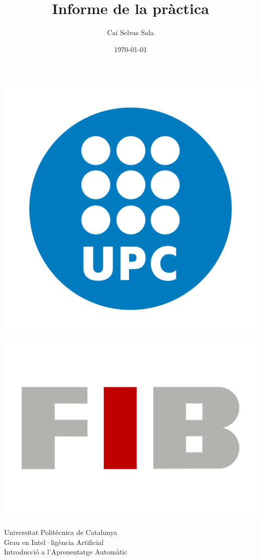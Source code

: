\begin{titlepage}

\title{\vspace{-4ex}\Huge\textbf{Informe de la pràctica}}
\author{\Large Cai Selvas Sala}
\date{\large\today}

\centering
\maketitle
\thispagestyle{empty}

\begin{centering}
\includegraphics[scale=0.17]{Logos UPC/Logo UPC.png}\\
\includegraphics[scale=0.13]{Logos UPC/Logo FIB.png}
\end{centering}

\LARGE
{Universitat Politècnica de Catalunya\\[5pt]
Grau en Intel·ligència Artificial\\[5pt]
Introducció a l'Aprenentatge Automàtic}

\end{titlepage}
